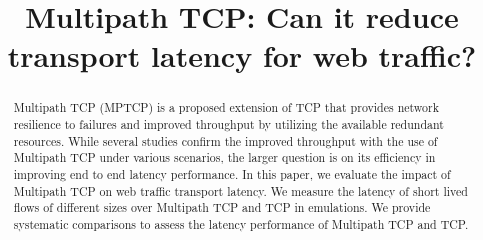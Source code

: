 \documentclass[conference,a4paper]{IEEEtran}
\theoremstyle{definition}
\newcommand{\per}[1]{\textcolor{orange}{{\sf PH: #1}}}
\begin{document}
\title{Multipath TCP: Can it reduce transport latency for web traffic?}

\author{
}

\maketitle


\begin{abstract}
Multipath TCP (MPTCP) is a proposed extension of TCP that provides network resilience to failures
and improved throughput by utilizing the available redundant resources. While several studies confirm
the improved throughput with the use of Multipath TCP under various scenarios, the larger question is on its 
efficiency in improving end to end latency performance.  In this paper, we evaluate the impact of Multipath TCP 
on web traffic transport latency. We measure the latency of short lived flows 
of different sizes over Multipath TCP and TCP in emulations. We provide systematic comparisons 
to assess the latency performance of Multipath TCP and TCP.

\end{abstract}














\end{document}
